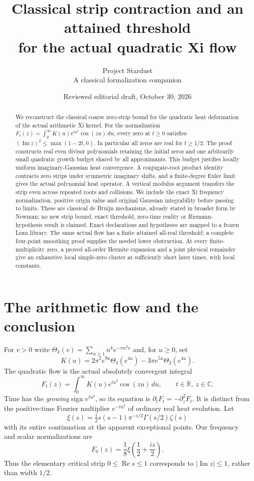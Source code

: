 \documentclass[11pt]{article}
\title{Classical strip contraction and an attained threshold\\for the actual quadratic Xi flow}
\author{Project Stardust\\\small A classical formalization companion}
\date{Reviewed editorial draft, October 30, 2026}
\newcommand{\R}{\mathbb R}\newcommand{\C}{\mathbb C}
\begin{document}
\maketitle
\begin{abstract}
We reconstruct the classical coarse zero-strip bound for the quadratic
heat deformation of the actual arithmetic Xi kernel. For the normalization
$F_t(z)=\int_0^\infty K(u)e^{tu^2}\cos(zu)\,du$, every zero at
$t\ge0$ satisfies $(\operatorname{Im}z)^2\le\max(1-2t,0)$.
In particular all zeros are real for $t\ge1/2$.
The proof constructs real even divisor polynomials retaining the initial
zeros and one arbitrarily small quadratic growth budget shared by all
approximants. This budget justifies locally uniform imaginary-Gaussian
heat convergence. A conjugate-root product identity contracts zero strips
under symmetric imaginary shifts, and a finite-degree Euler limit gives
the actual polynomial heat operator. A vertical modulus argument transfers
the strip even across repeated roots and collisions. We include the exact
Xi frequency normalization, positive origin value and original Gaussian
integrability before passing to limits. These are classical de Bruijn
mechanisms, already stated in broader form by Newman; no new strip bound,
exact threshold, zero-time reality or Riemann-hypothesis result is claimed.
Exact declarations and hypotheses are mapped to a frozen Lean library.
The same actual flow has a finite attained all-real threshold; a complete
four-point smoothing proof supplies the needed lower obstruction.
At every finite-multiplicity zero, a proved all-order Hermite expansion
and a joint physical remainder give an exhaustive local simple-zero
cluster at sufficiently short later times, with local constants.
\end{abstract}

\section{The arithmetic flow and the conclusion}
For $v>0$ write $\Theta_k(v)=\sum_{n\ge1}n^ke^{-\pi n^2v}$ and, for
$u\ge0$, set
\begin{equation}\label{eq:kernel}
 K(u)=2\pi^2e^{9u}\Theta_4(e^{4u})-3\pi e^{5u}\Theta_2(e^{4u}).
\end{equation}
The quadratic flow is the actual absolutely convergent integral
\begin{equation}\label{eq:flow}
 F_t(z)=\int_0^\infty K(u)e^{tu^2}\cos(zu)\,du,
       \qquad t\in\R,\ z\in\C.
\end{equation}
Time has the \emph{growing} sign $e^{tu^2}$, so its equation is
$\partial_tF_t=-\partial_z^2F_t$. It is distinct from the positive-time
Fourier multiplier $e^{-tu^2}$ of ordinary real heat evolution.
Let
\[
 \xi(s)=\tfrac12s(s-1)\pi^{-s/2}\Gamma(s/2)\zeta(s)
\]
with its entire continuation at the apparent exceptional points. Our
frequency and scalar normalizations are
\begin{equation}\label{eq:xi}
 F_0(z)=\frac18\xi\left(\frac12+\frac{iz}{2}\right).
\end{equation}
Thus the elementary critical strip $0\le\operatorname{Re}s\le1$
corresponds to $|\operatorname{Im}z|\le1$, rather than width $1/2$.
\end{document}

